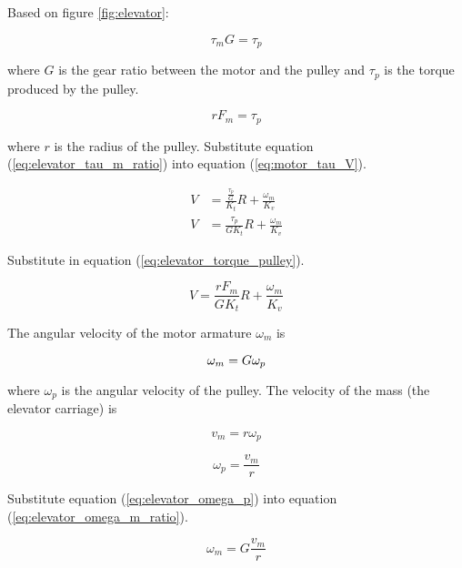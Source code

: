 Based on figure \ref{fig:elevator}:

\begin{equation}
  \tau_m G = \tau_p \label{eq:elevator_tau_m_ratio}
\end{equation}

where $G$ is the gear ratio between the motor and the pulley and $\tau_p$ is the
torque produced by the pulley.

\begin{equation}
  rF_m = \tau_p \label{eq:elevator_torque_pulley}
\end{equation}

where $r$ is the radius of the pulley. Substitute equation
(\ref{eq:elevator_tau_m_ratio}) into equation (\ref{eq:motor_tau_V}).

\begin{align*}
  V &= \frac{\frac{\tau_p}{G}}{K_t} R + \frac{\omega_m}{K_v} \\
  V &= \frac{\tau_p}{GK_t} R + \frac{\omega_m}{K_v}
\end{align*}

Substitute in equation (\ref{eq:elevator_torque_pulley}).

\begin{equation}
  V = \frac{rF_m}{GK_t} R + \frac{\omega_m}{K_v} \label{eq:elevator_Vinter1}
\end{equation}

The angular velocity of the motor armature $\omega_m$ is

\begin{equation}
  \omega_m = G \omega_p \label{eq:elevator_omega_m_ratio} \\
\end{equation}

where $\omega_p$ is the angular velocity of the pulley. The velocity of the mass
(the elevator carriage) is

\begin{equation*}
  v_m = r \omega_p
\end{equation*}

\begin{equation}
  \omega_p = \frac{v_m}{r} \label{eq:elevator_omega_p}
\end{equation}

Substitute equation (\ref{eq:elevator_omega_p}) into equation
(\ref{eq:elevator_omega_m_ratio}).

\begin{equation}
  \omega_m = G \frac{v_m}{r} \label{eq:elevator_omega_m}
\end{equation}

